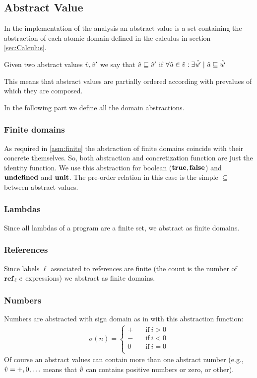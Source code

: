 \subsection{Abstract Value}
In the implementation of the analysis an abstract value is a set containing the abstraction of each atomic domain defined in the calculus in section \ref{sec:Calculus}.

\begin{definition}
Given two abstract values $\hat{v}, \hat{v}'$ we say that $\hat{v} \sqsubseteq \hat{v}'$ if $\forall \hat {u} \in \hat{v} :\exists \hat{u'} \mid \hat{u} \sqsubseteq \hat{u'}$
\end{definition}
This means that abstract values are partially ordered according with prevalues of which they are composed.

In the following part we define all the domain abstractions.

\subsubsection{Finite domains}
As required in \ref{asm:finite} the abstraction of finite domains coincide with their concrete themselves. So, both abstraction and concretization function are just the identity function. We use this abstraction for boolean ($\mathbf{true}, \mathbf{false}$) and $\mathbf{undefined}$ and $\mathbf{unit}$. The pre-order relation in this case is the simple $\subseteq$ between abstract values.

\subsubsection{Lambdas}
Since all lambdas of a program are a finite set, we abstract as finite domains.

\subsubsection{References}
Since labels $\ell$ associated to references are finite (the count is the number of $\mathbf{ref}_{\ell}\ e$ expressions) we abstract as finite domains.

\subsubsection{Numbers}
Numbers are abstracted with sign domain as in \cite{PrincipleProgramAnalysis} with this abstraction function:
\begin{align*}
\sigma (n)=
\begin{cases}
   + & \quad\text{if}\ i>0 \\
   - & \quad\text{if}\ i<0 \\
   0 & \quad\text{if}\ i=0 \\
\end{cases}
\end{align*}
Of course an abstract values can contain more than one abstract number (e.g., $\hat{v} = {+, 0, \dots}$ means that $\hat{v}$ can contains positive numbers or zero, or other). 

